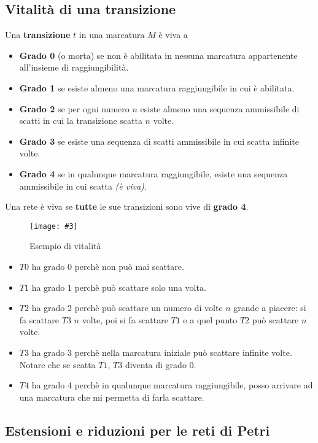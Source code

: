 \documentclass[12pt, twoside, letterpaper]{article}
\newcommand{\img}[3] {
	\begin{figure}[h]
		\caption{#1}
		\centering
		\texttt{[image: \#3]}\\
	\end{figure}
}
\begin{document}
		\subsection{Vitalità di una transizione}
			Una \textbf{transizione} $t$ in una marcatura $M$ è viva a
			\begin{itemize}
				\item \textbf{Grado 0} (o morta) se non è abilitata in nessuna marcatura appartenente all'insieme di raggiungibilità.
				\item \textbf{Grado 1} se esiste almeno una marcatura raggiungibile in cui è abilitata.
				\item \textbf{Grado 2} se per ogni numero $n$ esiste almeno una sequenza ammissibile di scatti in cui la transizione scatta $n$ volte.
				\item \textbf{Grado 3} se esiste una sequenza di scatti ammissibile in cui scatta infinite volte.
				\item \textbf{Grado 4} se in qualunque marcatura raggiungibile, esiste una sequenza ammissibile in cui scatta \textit{(è viva)}.
			\end{itemize}
			Una rete è viva se \textbf{tutte} le sue transizioni sono vive di \textbf{grado 4}.
			\img{Esempio di vitalità}{0.40}{img/vitalita.png}
			\begin{itemize}
				\item $T0$ ha grado 0 perchè non può mai scattare.
				\item $T1$ ha grado 1 perchè può scattare solo una volta.
				\item $T2$ ha grado 2 perchè può scattare un numero di volte $n$ grande a piacere: si fa scattare $T3$ $n$ volte, poi si fa scattare $T1$ e a quel punto $T2$ può scattare $n$ volte.
				\item $T3$ ha grado 3 perchè nella marcatura iniziale può scattare infinite volte. Notare che se scatta $T1$, $T3$ diventa di grado 0. 
				\item $T4$ ha grado 4 perchè in qualunque marcatura raggiungibile, posso arrivare ad una marcatura che mi permetta di farla scattare.
			\end{itemize}
		
		\subsection{Estensioni e riduzioni per le reti di Petri}
\end{document}
